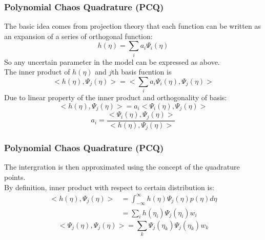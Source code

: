 \documentclass[10pt]{beamer}
\begin{document}
\begin{frame}
\frametitle{Polynomial Chaos Quadrature (PCQ)}
The basic idea comes from projection theory that each function can be written as an expansion of a series of orthogonal function:\\
\begin{equation}
     h(\eta)= \sum_i a_i \Psi_i (\eta) \label{eq:pcq-expansion}  
\end{equation}
So any uncertain parameter in the model can be expressed as above. \\
The inner product of $h(\eta)$ and $j$th basis fucntion is
\begin{equation}
     <h(\eta), \Psi_j (\eta) >= <\sum_i a_i \Psi_i (\eta), \Psi_j (\eta)>\label{eq:pcq-inner-product}
\end{equation}
Due to linear property of the inner product and orthogonality of basis:
\begin{equation}
     <h(\eta), \Psi_j (\eta) >= a_i<\Psi_i (\eta), \Psi_j (\eta)> \label{eq:pcq-inner-product-orthogonal}
\end{equation}
\begin{equation}
     a_i= \dfrac{<\Psi_i (\eta), \Psi_j (\eta)>}{<h(\eta), \Psi_j (\eta) >} \label{eq:pcq-coef}
\end{equation}
\end{frame}
\begin{frame}
\frametitle{Polynomial Chaos Quadrature (PCQ)}
The intergration is then approximated using the concept of the quadrature points.\\
By definition, inner product with respect to certain distribution is:
\begin{equation}
\begin{split}
      <h(\eta), \Psi_j (\eta) > &= \int_{-\infty}^{\infty} h(\eta) \Psi_j (\eta) p(\eta) d \eta \\
      &= \sum_i h(\eta_i) \Psi_j (\eta_i) w_i 
\end{split} \label{eq:pcq-gaussian-h} 
\end{equation}
\begin{equation}
      <\Psi_j (\eta), \Psi_j (\eta) > = \sum_k \Psi_j (\eta_k) \Psi_j (\eta_k) w_k \label{eq:pcq-gaussian-psi} 
\end{equation}
\end{frame}
\end{document}
